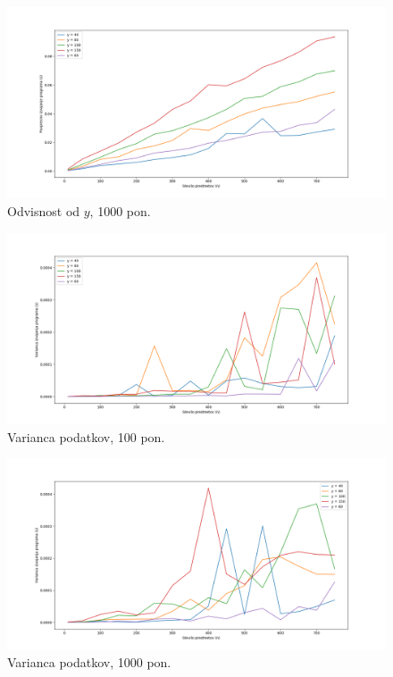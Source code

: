 \documentclass[a4paper, 11pt]{article}
\begin{document}
	\begin{figure}[h]
    	\centering
    		\includegraphics[scale=0.35]{Graf_1_1000.png}
    		\caption{Odvisnost od $y$, 1000 pon.}
    		\label{fig:graf1_1000}
	\end{figure}
	
	\begin{figure}[h]
    	\centering
    		\includegraphics[scale=0.35]{Graf_2_100.png}
    		\caption{Varianca podatkov, 100 pon.}
    		\label{fig:graf3_100}
	\end{figure}
	
	\begin{figure}[h]
    	\centering
    		\includegraphics[scale=0.35]{Graf_2_1000.png}
    		\caption{Varianca podatkov, 1000 pon.}
    		\label{fig:graf4_1000}
	\end{figure}
	
\end{document}
